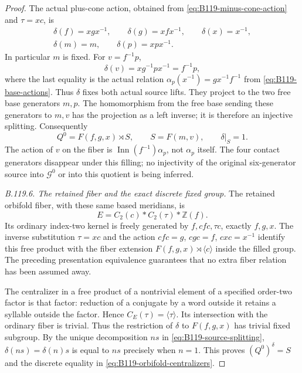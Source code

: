 \begin{proof}
The actual plus-cone action, obtained from
\eqref{eq:B119-minus-cone-action} and $\tau=xc$, is
\begin{equation}\label{eq:B119-plus-cone-action}
 \begin{gathered}
 \delta(f)=xgx^{-1},\qquad \delta(g)=xfx^{-1},\qquad
 \delta(x)=x^{-1},\\
 \delta(m)=m,\qquad \delta(p)=xpx^{-1}.
 \end{gathered}
\end{equation}
In particular $m$ is fixed. For $v=f^{-1}p$,
\[
 \delta(v)=xg^{-1}px^{-1}=f^{-1}p,
\]
where the last equality is the actual relation
$\alpha_p(x^{-1})=gx^{-1}f^{-1}$ from
\eqref{eq:B119-base-actions}. Thus $\delta$ fixes both actual
source lifts. They project to the two free base generators $m,p$.
The homomorphism from the free base sending these generators to
$m,v$ has the projection as a left inverse; it is therefore an
injective splitting. Consequently
\begin{equation}\label{eq:B119-source-splitting}
 Q^0=F(f,g,x)\rtimes S,\qquad S=F(m,v),\qquad
 \delta|_S=1.
\end{equation}
The action of $v$ on the fiber is
$\operatorname{Inn}(f^{-1})\alpha_p$, not $\alpha_p$ itself.
The four contact generators disappear under this filling; no
injectivity of the original six-generator source into
$\mathcal G^0$ or into this quotient is being inferred.

\emph{B.119.6. The retained fiber and the exact discrete fixed group.}
The retained orbifold fiber, with these same based meridians, is
\begin{equation}\label{eq:B119-orbifold-fiber}
 E=C_2(c)*C_2(\tau)*\mathbb Z(f).
\end{equation}
Its ordinary index-two kernel is freely generated by
$f,cfc,\tau c$, exactly $f,g,x$. The inverse substitution
$\tau=xc$ and the action
$cfc=g$, $cgc=f$, $cxc=x^{-1}$ identify this free product with
the fiber extension $F(f,g,x)\rtimes\langle c\rangle$ inside
the filled group. The preceding presentation equivalence guarantees
that no extra fiber relation has been assumed away.

The centralizer in a free product of a nontrivial element of a
specified order-two factor is that factor: reduction of a conjugate
by a word outside it retains a syllable outside the factor. Hence
$C_E(\tau)=\langle\tau\rangle$. Its intersection with the ordinary
fiber is trivial. Thus the restriction of $\delta$ to $F(f,g,x)$
has trivial fixed subgroup. By the unique decomposition
$ns$ in \eqref{eq:B119-source-splitting},
$\delta(ns)=\delta(n)s$ is equal to $ns$ precisely when $n=1$.
This proves $(Q^0)^\delta=S$ and the discrete equality in
\eqref{eq:B119-orbifold-centralizers}.


\end{proof}
